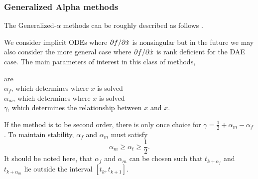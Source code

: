 \documentclass[pdf,ps2pdf,11pt]{SANDreport}
\begin{document}
\subsubsection{Generalized Alpha methods}

The Generalized-$\alpha$ methods can be roughly described as follows
{}\cite{ChungHulbert,JansenWhitingHulbert,BonelliBursiErlicherVulcan}.

We consider implicit ODEs where $\partial f / \partial \dot{x}$ is nonsingular but in the
future we may also consider the more general case where $\partial f / \partial \dot{x}$ is
rank deficient for the DAE case.  The main parameters of interest in this
class of methods,
\begin{tabbing}
\hspace{4ex}are\hspace{5ex}\= \\
\>	$\alpha_f$, which determines where $x$ is solved \\
\>	$\alpha_m$, which determines where $\dot{x}$ is solved \\
\>	$\gamma$, which determines the relationship between $x$ and $\dot{x}$. 
\end{tabbing}

If the method is to be second order, there is only once choice for $\gamma =
{}\frac{1}{2}+\alpha_m - {}\alpha_f$.  To maintain stability, $\alpha_f$ and
$\alpha_m$ must satisfy
%
\begin{equation}\label{rythmos:eqn:genalpha:stab}
\alpha_m \ge \alpha_t \ge \frac{1}{2}.
\end{equation}
%
It should be noted here, that $\alpha_f$ and $\alpha_m$ can be chosen such
that $t_{k+\alpha_f}$ and $t_{k+\alpha_m}$ lie outside the interval
$[t_k,t_{k+1}]$.
\end{document}
